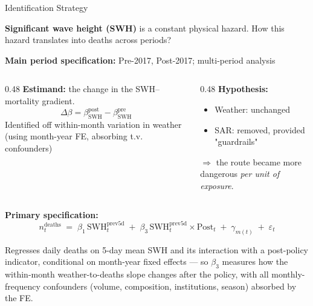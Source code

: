 \documentclass[aspectratio=169,10pt]{beamer}
\begin{document}
\begin{frame}{Identification Strategy}

\textbf{Significant wave height (SWH)} is a constant physical hazard. How this hazard translates into deaths across periods?

\textbf{Main period specification:} Pre-2017, Post-2017; multi-period analysis 

\vspace{0.5em}
\begin{columns}[T]
\begin{column}{0.48\textwidth}
\textbf{Estimand:} the change in the SWH--mortality gradient.
\[
\Delta\beta = \beta^{\text{post}}_{\text{SWH}} - \beta^{\text{pre}}_{\text{SWH}}
\]
Identified off within-month variation in weather (using month-year FE, absorbing t.v. confounders)
\end{column}
\begin{column}{0.48\textwidth}
\textbf{Hypothesis:}
\begin{itemize}
  \item Weather: unchanged
  \item SAR: removed, provided "guardrails"
\end{itemize}
$\Rightarrow$ the route became more dangerous \emph{per unit of exposure}.
\end{column}
\end{columns}

\vspace{0.5em}
\textbf{Primary specification:}
\[
n^{\text{deaths}}_{t} \;=\; \beta_{1}\,\text{SWH}^{\text{prev5d}}_{t}
\;+\; \beta_{3}\,\text{SWH}^{\text{prev5d}}_{t}\!\times\!\text{Post}_t
\;+\; \gamma_{m(t)} \;+\; \varepsilon_{t}
\]

\vspace{0.4em}
\footnotesize
Regresses daily deaths on 5-day mean SWH and its interaction with a
post-policy indicator, conditional on month-year fixed effects --- so
$\beta_3$ measures how the within-month weather-to-deaths slope changes after
the policy, with all monthly-frequency confounders (volume, composition,
institutions, season) absorbed by the FE.

\end{frame}
\end{document}
